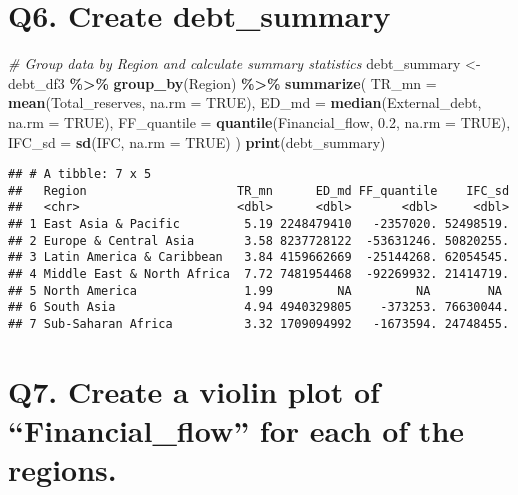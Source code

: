 \documentclass[
]{article}
\newenvironment{Shaded}{\begin{snugshade}}{\end{snugshade}}
\newcommand{\AttributeTok}[1]{\textcolor[rgb]{0.13,0.29,0.53}{#1}}
\newcommand{\CommentTok}[1]{\textcolor[rgb]{0.56,0.35,0.01}{\textit{#1}}}
\newcommand{\ConstantTok}[1]{\textcolor[rgb]{0.56,0.35,0.01}{#1}}
\newcommand{\FloatTok}[1]{\textcolor[rgb]{0.00,0.00,0.81}{#1}}
\newcommand{\FunctionTok}[1]{\textcolor[rgb]{0.13,0.29,0.53}{\textbf{#1}}}
\newcommand{\NormalTok}[1]{#1}
\newcommand{\OtherTok}[1]{\textcolor[rgb]{0.56,0.35,0.01}{#1}}
\newcommand{\SpecialCharTok}[1]{\textcolor[rgb]{0.81,0.36,0.00}{\textbf{#1}}}
\begin{document}
\section{Q6. Create debt\_summary}\label{q6.-create-debt_summary}

\begin{Shaded}
\begin{Highlighting}[]
\CommentTok{\# Group data by Region and calculate summary statistics}
\NormalTok{debt\_summary }\OtherTok{\textless{}{-}}\NormalTok{ debt\_df3 }\SpecialCharTok{\%\textgreater{}\%}
  \FunctionTok{group\_by}\NormalTok{(Region) }\SpecialCharTok{\%\textgreater{}\%}
  \FunctionTok{summarize}\NormalTok{(}
    \AttributeTok{TR\_mn =} \FunctionTok{mean}\NormalTok{(Total\_reserves, }\AttributeTok{na.rm =} \ConstantTok{TRUE}\NormalTok{),}
    \AttributeTok{ED\_md =} \FunctionTok{median}\NormalTok{(External\_debt, }\AttributeTok{na.rm =} \ConstantTok{TRUE}\NormalTok{),}
    \AttributeTok{FF\_quantile =} \FunctionTok{quantile}\NormalTok{(Financial\_flow, }\FloatTok{0.2}\NormalTok{, }\AttributeTok{na.rm =} \ConstantTok{TRUE}\NormalTok{),}
    \AttributeTok{IFC\_sd =} \FunctionTok{sd}\NormalTok{(IFC, }\AttributeTok{na.rm =} \ConstantTok{TRUE}\NormalTok{)}
\NormalTok{  )}
\FunctionTok{print}\NormalTok{(debt\_summary)}
\end{Highlighting}
\end{Shaded}

\begin{verbatim}
## # A tibble: 7 x 5
##   Region                     TR_mn      ED_md FF_quantile    IFC_sd
##   <chr>                      <dbl>      <dbl>       <dbl>     <dbl>
## 1 East Asia & Pacific         5.19 2248479410   -2357020. 52498519.
## 2 Europe & Central Asia       3.58 8237728122  -53631246. 50820255.
## 3 Latin America & Caribbean   3.84 4159662669  -25144268. 62054545.
## 4 Middle East & North Africa  7.72 7481954468  -92269932. 21414719.
## 5 North America               1.99         NA         NA        NA 
## 6 South Asia                  4.94 4940329805    -373253. 76630044.
## 7 Sub-Saharan Africa          3.32 1709094992   -1673594. 24748455.
\end{verbatim}

\section{Q7. Create a violin plot of ``Financial\_flow'' for each of the
regions.}\label{q7.-create-a-violin-plot-of-financial_flow-for-each-of-the-regions.}
\end{document}
